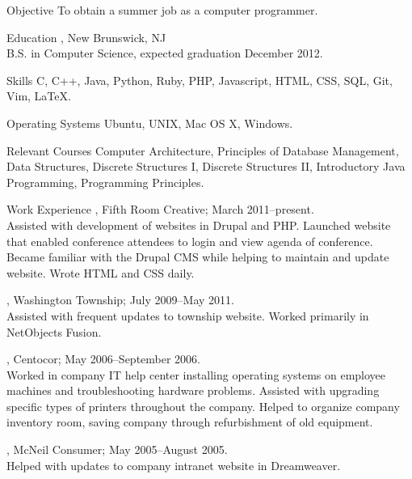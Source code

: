 \documentclass{resume}
\author{~~~~~~Michael J. Wilcox}
\begin{document}
\maketitle

\begin{category}{Objective}
\citemnobullet
To obtain a summer job as a computer programmer.
\end{category}


\begin{category}{Education}
, New Brunswick, NJ\\
B.S. in Computer Science, expected graduation December 2012.
\end{category}

\begin{category}{Skills}
\citemnobullet 
C, C++, Java, Python, Ruby, PHP, Javascript, HTML, CSS, SQL, Git, Vim, \LaTeX.
\end{category}

\begin{category}{Operating Systems}
\citemnobullet
Ubuntu, UNIX, Mac OS X, Windows.\\
\end{category}

\begin{category}{Relevant Courses}
\citemnobullet
Computer Architecture, Principles of Database Management, Data Structures, Discrete Structures I, Discrete Structures II, Introductory Java Programming, Programming Principles.\\
\end{category}

\begin{category}{Work Experience}
, Fifth Room Creative;
March 2011--present.\\
Assisted with development of websites in Drupal and PHP. Launched website that enabled conference attendees to login and view agenda of conference. Became familiar with the Drupal CMS while helping to maintain and update website. Wrote HTML and CSS daily. %

, Washington Township;
July 2009--May 2011.\\
Assisted with frequent updates to township website. Worked primarily in NetObjects Fusion. %

, Centocor;
May 2006--September 2006.\\
Worked in company IT help center installing operating systems on employee machines and troubleshooting hardware problems. Assisted with upgrading specific types of printers throughout the company. Helped to organize company inventory room, saving company through refurbishment of old equipment. %

, McNeil Consumer;
May 2005--August 2005.\\
Helped with updates to company intranet website in Dreamweaver. %
\end{category}
\end{document}
